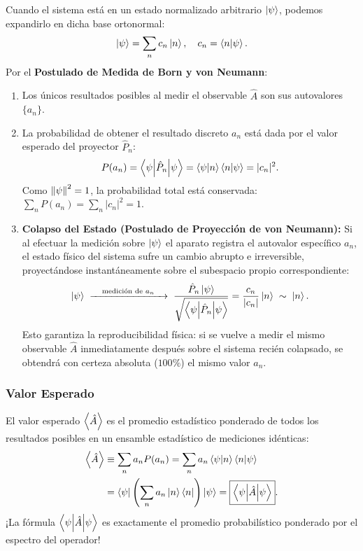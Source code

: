 Cuando el sistema está en un estado normalizado arbitrario $\left| \psi \right\rangle$, podemos expandirlo en dicha base ortonormal:
\begin{equation}
    \left| \psi \right\rangle = \sum_n c_n \left| n \right\rangle, \quad c_n = \left\langle n \middle| \psi \right\rangle.
\end{equation}
Por el \textbf{Postulado de Medida de Born y von Neumann}:
\begin{enumerate}
    \item Los únicos resultados posibles al medir el observable $\hat{A}$ son sus autovalores $\{a_n\}$.
    \item La probabilidad de obtener el resultado discreto $a_n$ está dada por el valor esperado del proyector $\hat{P}_n$:
    \begin{equation}
        P(a_n) = \left\langle \psi \middle| \hat{P}_n \middle| \psi \right\rangle = \left\langle \psi \middle| n \right\rangle\left\langle n \middle| \psi \right\rangle = |c_n|^2.
    \end{equation}
    Como $\left\| \psi \right\|^2 = 1$, la probabilidad total está conservada: $\sum_n P(a_n) = \sum_n |c_n|^2 = 1$.
    \item \textbf{Colapso del Estado (Postulado de Proyección de von Neumann):} Si al efectuar la medición sobre $\left| \psi \right\rangle$ el aparato registra el autovalor específico $a_n$, el estado físico del sistema sufre un cambio abrupto e irreversible, proyectándose instantáneamente sobre el subespacio propio correspondiente:
    \begin{equation}
        \left| \psi \right\rangle \;\xrightarrow{\quad\text{medición de } a_n\quad}\; \frac{\hat{P}_n\left| \psi \right\rangle}{\sqrt{\left\langle \psi \middle| \hat{P}_n \middle| \psi \right\rangle}} = \frac{c_n}{|c_n|}\left| n \right\rangle \;\sim\; \left| n \right\rangle.
    \end{equation}
    Esto garantiza la reproducibilidad física: si se vuelve a medir el mismo observable $\hat{A}$ inmediatamente después sobre el sistema recién colapsado, se obtendrá con certeza absoluta ($100\%$) el mismo valor $a_n$.
\end{enumerate}

\subsubsection{Valor Esperado}
El valor esperado $\left\langle \hat{A} \right\rangle$ es el promedio estadístico ponderado de todos los resultados posibles en un ensamble estadístico de mediciones idénticas:
\begin{align}
    \left\langle \hat{A} \right\rangle &\equiv \sum_n a_n P(a_n) = \sum_n a_n \left\langle \psi \middle| n \right\rangle\left\langle n \middle| \psi \right\rangle \nonumber\\
    &= \left\langle \psi \right| \left( \sum_n a_n \left| n \right\rangle\left\langle n \right| \right) \left| \psi \right\rangle = \boxed{\left\langle \psi \middle| \hat{A} \middle| \psi \right\rangle}.
    \label{eq:expectation_value}
\end{align}
¡La fórmula $\left\langle \psi \middle| \hat{A} \middle| \psi \right\rangle$ es exactamente el promedio probabilístico ponderado por el espectro del operador!


